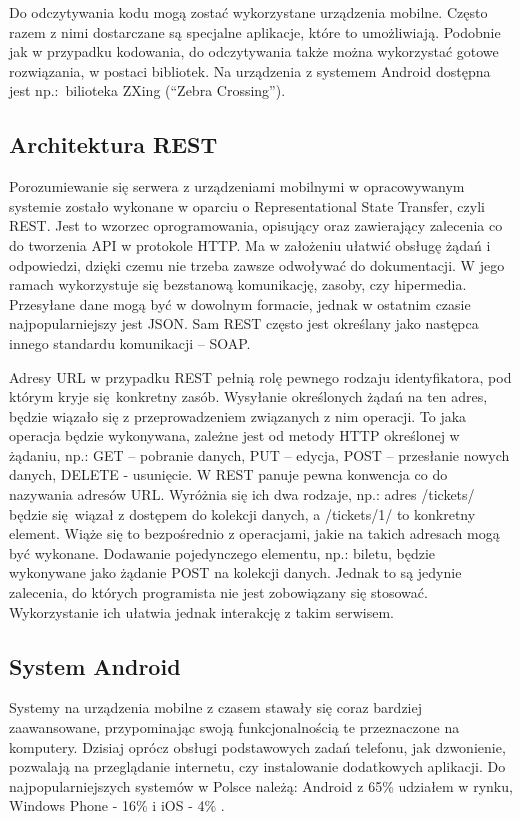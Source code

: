 Do odczytywania kodu mogą zostać wykorzystane urządzenia mobilne. Często razem z nimi dostarczane są specjalne aplikacje, które to umożliwiają. Podobnie jak w przypadku kodowania, do odczytywania także można wykorzystać gotowe rozwiązania, w postaci bibliotek. Na urządzenia z systemem Android dostępna jest np.:~bilioteka ZXing (``Zebra Crossing'').

\subsection{Architektura REST}

Porozumiewanie się serwera z urządzeniami mobilnymi w opracowywanym systemie zostało wykonane w oparciu o Representational State Transfer, czyli REST. Jest to wzorzec oprogramowania, opisujący oraz zawierający zalecenia co do tworzenia API w protokole HTTP. Ma w założeniu ułatwić obsługę żądań i odpowiedzi, dzięki czemu nie trzeba zawsze odwoływać do dokumentacji. W jego ramach wykorzystuje się bezstanową komunikację, zasoby, czy hipermedia. Przesyłane dane mogą być w dowolnym formacie, jednak w ostatnim czasie najpopularniejszy jest JSON. Sam REST często jest określany jako następca innego standardu komunikacji -- SOAP.

Adresy URL w przypadku REST pełnią rolę pewnego rodzaju identyfikatora, pod którym kryje się konkretny zasób. Wysyłanie określonych żądań na ten adres, będzie wiązało się z przeprowadzeniem związanych z nim operacji. To jaka operacja będzie wykonywana, zależne jest od metody HTTP określonej w żądaniu, np.: GET -- pobranie danych, PUT -- edycja, POST -- przesłanie nowych danych, DELETE - usunięcie. W REST panuje pewna konwencja co do nazywania adresów URL. Wyróżnia się ich dwa rodzaje, np.: adres /tickets/ będzie się wiązał z dostępem do kolekcji danych, a /tickets/1/ to konkretny element. Wiąże się to bezpośrednio z operacjami, jakie na takich adresach mogą być wykonane. Dodawanie pojedynczego elementu, np.: biletu, będzie wykonywane jako żądanie POST na kolekcji danych. Jednak to są jedynie zalecenia, do których programista nie jest zobowiązany się stosować. Wykorzystanie ich ułatwia jednak interakcję z takim serwisem.

\subsection{System Android}

Systemy na urządzenia mobilne z czasem stawały się coraz bardziej zaawansowane, przypominając swoją funkcjonalnością te przeznaczone na komputery. Dzisiaj oprócz obsługi podstawowych zadań telefonu, jak dzwonienie, pozwalają na przeglądanie internetu, czy instalowanie dodatkowych aplikacji. Do najpopularniejszych systemów w Polsce należą: Android z 65\% udziałem w rynku, Windows Phone - 16\% i iOS - 4\% \cite{polska_jest_mobi}.

